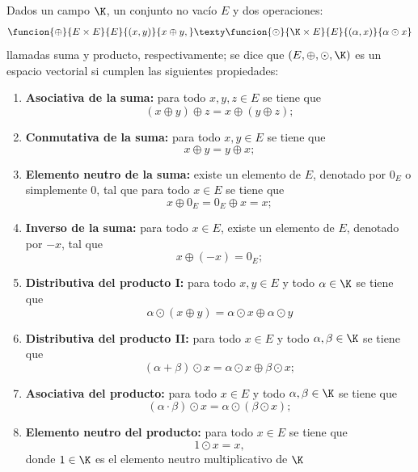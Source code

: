 \documentclass[compacto,10pt]{pubciencias-notas}
\begin{document}
\begin{defi}
    Dados un campo $\K$, un conjunto no vacío $E$ y dos operaciones:
    \[
        \funcion{\oplus}{E\times E}{E}{(x,y)}{x\oplus y,}
        \texty
        \funcion{\odot}{\K\times E}{E}{(\alpha,x)}{\alpha\odot x}
    \]
    llamadas suma y producto, respectivamente; se dice que $(E,\oplus,\odot,\K)$ es un espacio vectorial si cumplen las siguientes propiedades:
    \begin{enumerate}
    \item \textbf{Asociativa de la suma:}
        para todo $x,y,z\in E$ se tiene que
        \[
            (x \oplus y) \oplus z = x \oplus (y \oplus z);
        \]
    \item \textbf{Conmutativa de la suma:}
        para todo $x,y\in E$ se tiene que
        \[
            x \oplus y = y \oplus x;
        \]
    \item \textbf{Elemento neutro de la suma:}
        existe un elemento de $E$, denotado por $0_E$ o simplemente $0$, tal que para todo $x\in E$ se tiene que 
        \[
            x \oplus 0_E = 0_E \oplus x = x;
        \]
    \item \textbf{Inverso de la suma:}
        para todo $x\in E$, existe un elemento de $E$, denotado por $-x$, tal que
        \[
            x \oplus (-x)= 0_E;
        \]
    \item \textbf{Distributiva del producto I:}
        para todo $x,y\in E$ y todo $\alpha\in \K$ se tiene que
        \[
            \alpha\odot (x \oplus y)=\alpha\odot x \oplus \alpha\odot y
        \]
        
    \item \textbf{Distributiva del producto II:}
        para todo $x\in E$ y todo $\alpha,\beta\in \K$ se tiene que
        \[
            (\alpha+\beta)\odot x=\alpha\odot x \oplus \beta\odot x;
        \]
    \item \textbf{Asociativa del producto:}
        para todo $x\in E$ y todo $\alpha,\beta\in \K$ se tiene que
        \[
            (\alpha\cdot \beta)\odot x=\alpha\odot(\beta\odot x);
        \]
    \item \textbf{Elemento neutro del producto:}
        para todo $x\in E$ se tiene que
        \[
            1\odot x=x,
        \]
        donde $1\in\K$ es el elemento neutro multiplicativo de $\K$
    \end{enumerate}
\end{defi}

\end{document}
